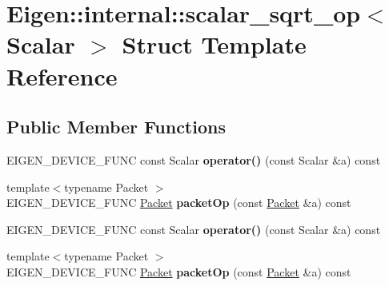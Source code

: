 \hypertarget{struct_eigen_1_1internal_1_1scalar__sqrt__op}{}\section{Eigen\+:\+:internal\+:\+:scalar\+\_\+sqrt\+\_\+op$<$ Scalar $>$ Struct Template Reference}
\label{struct_eigen_1_1internal_1_1scalar__sqrt__op}
\subsection*{Public Member Functions}
\begin{DoxyCompactItemize}
\item 
\mbox{\label{struct_eigen_1_1internal_1_1scalar__sqrt__op_a6292a98edf3322b52f80a4c376773a92}} 
E\+I\+G\+E\+N\+\_\+\+D\+E\+V\+I\+C\+E\+\_\+\+F\+U\+NC const Scalar {\bfseries operator()} (const Scalar \&a) const
\item 
\mbox{\label{struct_eigen_1_1internal_1_1scalar__sqrt__op_ac83e66625cb0ed4e8aefe65ad055936b}} 
{\footnotesize template$<$typename Packet $>$ }\\E\+I\+G\+E\+N\+\_\+\+D\+E\+V\+I\+C\+E\+\_\+\+F\+U\+NC \hyperlink{union_eigen_1_1internal_1_1_packet}{Packet} {\bfseries packet\+Op} (const \hyperlink{union_eigen_1_1internal_1_1_packet}{Packet} \&a) const
\item 
\mbox{\label{struct_eigen_1_1internal_1_1scalar__sqrt__op_a6292a98edf3322b52f80a4c376773a92}} 
E\+I\+G\+E\+N\+\_\+\+D\+E\+V\+I\+C\+E\+\_\+\+F\+U\+NC const Scalar {\bfseries operator()} (const Scalar \&a) const
\item 
\mbox{\label{struct_eigen_1_1internal_1_1scalar__sqrt__op_ac83e66625cb0ed4e8aefe65ad055936b}} 
{\footnotesize template$<$typename Packet $>$ }\\E\+I\+G\+E\+N\+\_\+\+D\+E\+V\+I\+C\+E\+\_\+\+F\+U\+NC \hyperlink{union_eigen_1_1internal_1_1_packet}{Packet} {\bfseries packet\+Op} (const \hyperlink{union_eigen_1_1internal_1_1_packet}{Packet} \&a) const
\end{DoxyCompactItemize}


